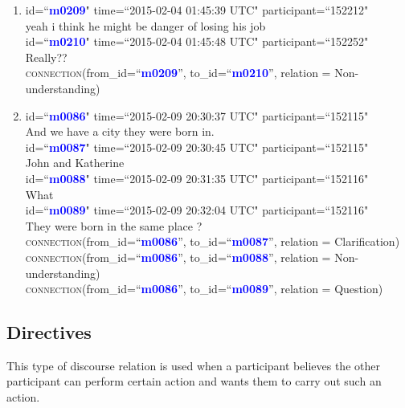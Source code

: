 \documentclass{article}
\begin{document}
\begin{enumerate}[resume]
\item id=``\textbf{\textcolor{blue}{m0209}}" time=``2015-02-04 01:45:39 UTC" participant=``152212"\\
yeah i think he might be danger of losing his job\\
id=``\textbf{\textcolor{blue}{m0210}}" time=``2015-02-04 01:45:48 UTC" participant=``152252"\\
Really?? \\
\textsc{connection}(from\_id=``\textbf{\textcolor{blue}{m0209}}'', to\_id=``\textbf{\textcolor{blue}{m0210}}'', relation = Non-understanding)
\item id=``\textbf{\textcolor{blue}{m0086}}" time=``2015-02-09 20:30:37 UTC" participant=``152115"\\
And we have a city they were born in.\\
id=``\textbf{\textcolor{blue}{m0087}}" time=``2015-02-09 20:30:45 UTC" participant=``152115"\\
John and Katherine\\
id=``\textbf{\textcolor{blue}{m0088}}" time=``2015-02-09 20:31:35 UTC" participant=``152116"\\
What\\
id=``\textbf{\textcolor{blue}{m0089}}" time=``2015-02-09 20:32:04 UTC" participant=``152116"\\
They were born in the same place ?\\
\textsc{connection}(from\_id=``\textbf{\textcolor{blue}{m0086}}'', to\_id=``\textbf{\textcolor{blue}{m0087}}'', relation = Clarification)\\
\textsc{connection}(from\_id=``\textbf{\textcolor{blue}{m0086}}'', to\_id=``\textbf{\textcolor{blue}{m0088}}'', relation = Non-understanding)\\
\textsc{connection}(from\_id=``\textbf{\textcolor{blue}{m0086}}'', to\_id=``\textbf{\textcolor{blue}{m0089}}'', relation = Question)
\end{enumerate}

\subsection{Directives}
This type of discourse relation is used when a participant believes the other participant can perform certain action and wants them to carry out such an action.
\end{document}
